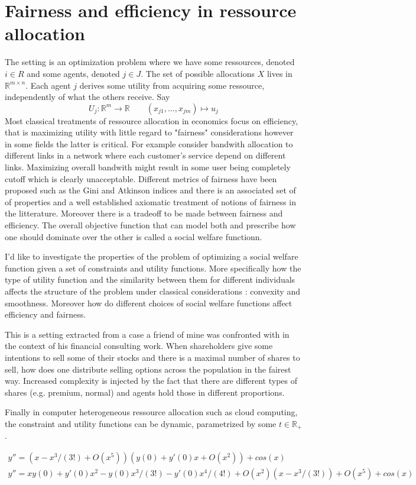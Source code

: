 \section*{Fairness and efficiency in ressource allocation}
The setting is an optimization problem where we have some
ressources, denoted $i\in R$ and some agents, denoted $j\in J$.
The set of possible allocations $X$ lives in $\mathbb R^{m\times n}$.
Each agent $j$ derives some utility from acquiring some ressource, 
independently of what the others receive.
Say \begin{equation} U_j: \mathbb R^{m} \longrightarrow \mathbb R
\qquad (x_{j1},\ldots,x_{jm})\mapsto u_j\end{equation}
Most classical treatments of ressource allocation in economics focus on
efficiency, that is maximizing utility with little regard to "fairness"
considerations however in some fields the latter is critical.  For example
consider bandwith allocation to different links in a network where each
customer's service depend on different links. Maximizing overall bandwith
might result in some user being completely cutoff which is clearly
unacceptable. Different metrics of fairness have been proposed such as the
Gini and Atkinson indices and there is an associated set of
of properties and a well established axiomatic treatment of notions
of fairness in the litterature.
Moreover there is a tradeoff to be made between fairness and efficiency.
The overall objective function that can model both and prescribe
how one should dominate over the other is called a social welfare functionn.

I'd like to investigate the properties of the problem of optimizing a social
welfare function given a set of constraints and utility functions. More
specifically how the type of utility function and the similarity between them
for different individuals affects the structure of the problem under
classical considerations : convexity and smoothness. Moreover how 
do different choices of social welfare functions affect efficiency and 
fairness.

This is a setting extracted from a case a friend of mine was confronted with 
in the context of his financial consulting work.
When shareholders give some intentions to sell some of their stocks and
there is a maximal number of shares to sell, how does one distribute selling
options across the population in the fairest way. Increased complexity
is injected by the fact that there are different types of shares (e.g.
premium, normal) and agents hold those in different proportions.

Finally in computer heterogeneous  ressource allocation such as cloud computing,
the constraint and utility functions can be dynamic, parametrized by some 
$t\in \mathbb R_+$.


\begin{gather}
    y'' = (x-x^3/(3!) + O(x^5))(y(0) + y'(0)x+ O(x^2)) + cos(x)\\
y'' = xy(0) + y'(0)x^2 - y(0)x^3/(3!) - y'(0)x^4/(4!) + O(x^2)(x-x^3/(3!)) + O(x^5) + cos(x)
\end{gather}
    


